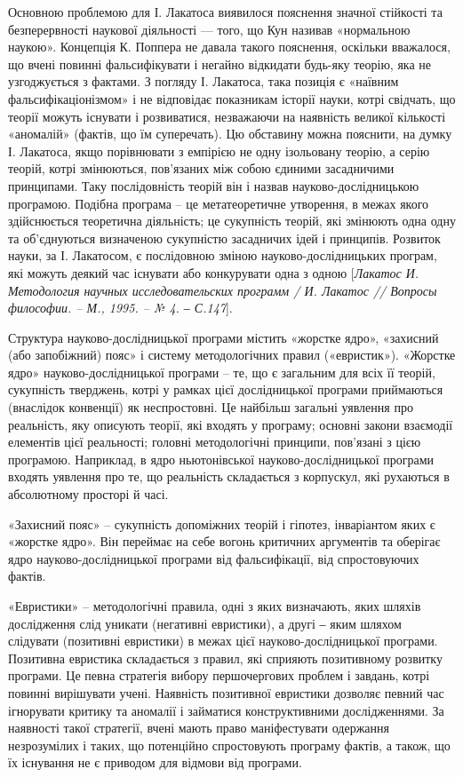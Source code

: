 Основною проблемою для І. Лакатоса виявилося пояснення значної
стійкості та безперервності наукової діяльності --- того, що Кун називав
«нормальною наукою». Концепція К. Поппера не давала такого пояснення,
оскільки вважалося, що вчені повинні фальсифікувати і негайно відкидати
будь-яку теорію, яка не узгоджується з фактами. З погляду І. Лакатоса, така
позиція є «наївним фальсифікаціонізмом» і не відповідає показникам історії
науки, котрі свідчать, що теорії можуть існувати і розвиватися, незважаючи на
наявність великої кількості «аномалій» (фактів, що їм суперечать). Цю
обставину можна пояснити, на думку І. Лакатоса, якщо порівнювати з емпірією
не одну ізольовану теорію, а серію теорій, котрі змінюються, пов’язаних між
собою єдиними засадничими принципами. Таку послідовність теорій він і
назвав науково-дослідницькою програмою. Подібна програма – це
метатеоретичне утворення, в межах якого здійснюється теоретична діяльність;
це сукупність теорій, які змінюють одна одну та об’єднуються визначеною
сукупністю засадничих ідей і принципів. Розвиток науки, за І. Лакатосом, є
послідовною зміною науково-дослідницьких програм, які можуть деякий час
існувати або конкурувати одна з одною [\textit{Лакатос И. Методология научных
исследовательских программ / И. Лакатос // Вопросы философии. – М., 1995. –
№ 4. ‒ С.147}].

Структура науково-дослідницької програми містить «жорстке ядро»,
«захисний (або запобіжний) пояс» і систему методологічних правил
(«евристик»). «Жорстке ядро» науково-дослідницької програми – те, що є
загальним для всіх її теорій, сукупність тверджень, котрі у рамках цієї
дослідницької програми приймаються (внаслідок конвенції) як неспростовні.
Це найбільш загальні уявлення про реальність, яку описують теорії, які входять
у програму; основні закони взаємодії елементів цієї реальності; головні
методологічні принципи, пов’язані з цією програмою. Наприклад, в ядро
ньютонівської науково-дослідницької програми входять уявлення про те, що
реальність складається з корпускул, які рухаються в абсолютному просторі й
часі.

«Захисний пояс» – сукупність допоміжних теорій і гіпотез, інваріантом яких
є «жор\-стке ядро». Він переймає на себе вогонь критичних аргументів та
оберігає ядро науково-дослідницької програми від фальсифікації, від
спростовуючих фактів.

«Евристики» – методологічні правила, одні з яких визначають, яких шляхів
дослідження слід уникати (негативні евристики), а другі ‒ яким шляхом
слідувати (позитивні евристики) в межах цієї науково-дослідницької програми.
Позитивна евристика складається з правил, які сприяють позитивному розвитку
програми. Це певна стратегія вибору першочергових проблем і завдань, котрі
повинні вирішувати учені. Наявність позитивної евристики дозволяє певний час
ігнорувати критику та аномалії і займатися конструктивними дослідженнями.
За наявності такої стратегії, вчені мають право маніфестувати одержання
незрозумілих і таких, що потенційно спростовують програму фактів, а також,
що їх існування не є приводом для відмови від програми. 

